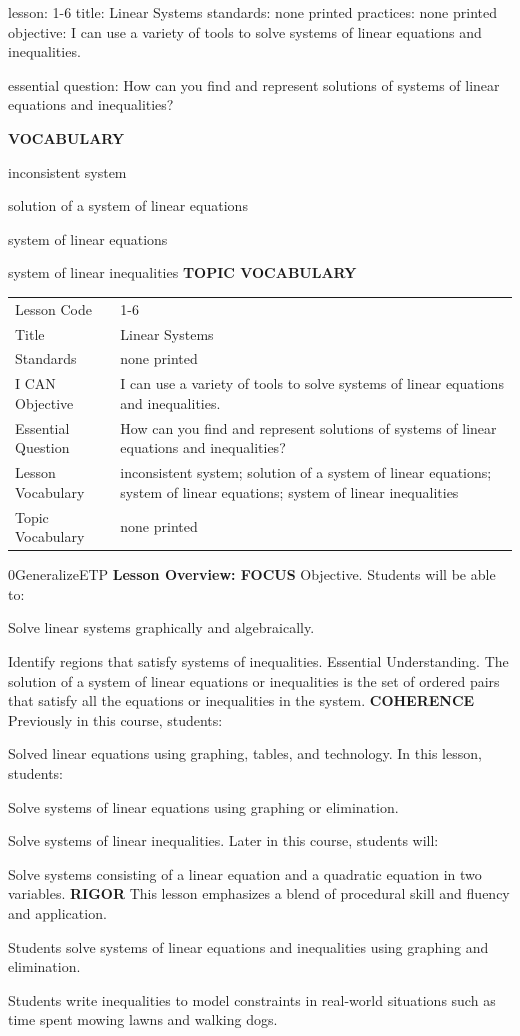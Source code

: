 \documentclass{article}
\newenvironment{lesson-meta}{}{}        %
\newenvironment{te-addendum}[2]{}{}     %
\newcommand{\te}[1]{}                   %
\begin{document}
\begin{lesson-meta}
lesson: 1-6
title: Linear Systems
standards: none printed
practices: none printed
objective: I can use a variety of tools to solve systems of linear equations and inequalities.

essential question: How can you find and represent solutions of systems of linear equations and inequalities?

\textbf{VOCABULARY}
\item inconsistent system
\item solution of a system of linear equations
\item system of linear equations
\item system of linear inequalities
\textbf{TOPIC VOCABULARY}
\te{No separate topic vocabulary list is printed on these lesson pages.}
\begin{tabular}{ll}
Lesson Code & 1-6 \\
Title & Linear Systems \\
Standards & none printed \\
I CAN Objective & I can use a variety of tools to solve systems of linear equations and inequalities. \\
Essential Question & How can you find and represent solutions of systems of linear equations and inequalities? \\
Lesson Vocabulary & inconsistent system; solution of a system of linear equations; system of linear equations; system of linear inequalities \\
Topic Vocabulary & none printed \\
\end{tabular}
\end{lesson-meta}
\begin{te-addendum}{0}{GeneralizeETP}
\textbf{Lesson Overview: FOCUS}
Objective. Students will be able to:
\item Solve linear systems graphically and algebraically.
\item Identify regions that satisfy systems of inequalities.
Essential Understanding. The solution of a system of linear equations or inequalities is the set of ordered pairs that satisfy all the equations or inequalities in the system.
\textbf{COHERENCE}
Previously in this course, students:
\item Solved linear equations using graphing, tables, and technology.
In this lesson, students:
\item Solve systems of linear equations using graphing or elimination.
\item Solve systems of linear inequalities.
Later in this course, students will:
\item Solve systems consisting of a linear equation and a quadratic equation in two variables.
\textbf{RIGOR}
This lesson emphasizes a blend of procedural skill and fluency and application.
\item Students solve systems of linear equations and inequalities using graphing and elimination.
\item Students write inequalities to model constraints in real-world situations such as time spent mowing lawns and walking dogs.
\end{te-addendum}
\end{document}
